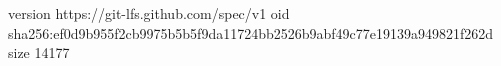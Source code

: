 version https://git-lfs.github.com/spec/v1
oid sha256:ef0d9b955f2cb9975b5b5f9da11724bb2526b9abf49c77e19139a949821f262d
size 14177
